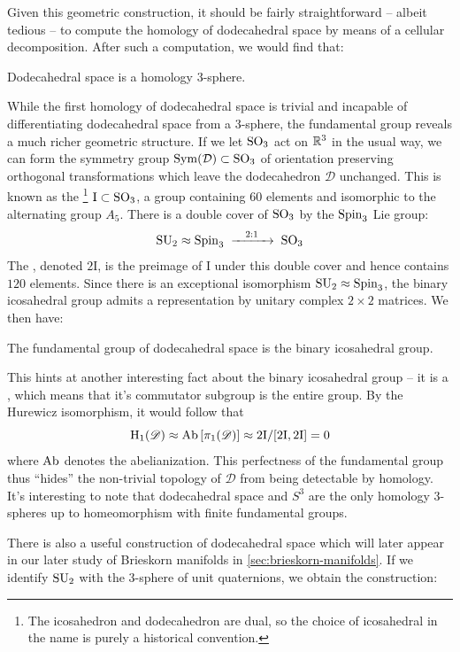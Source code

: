 Given this geometric construction, it should be fairly straightforward -- albeit tedious -- to compute the homology of dodecahedral space by means of a cellular decomposition. After such a computation, we would find that:
\begin{proposition}
	Dodecahedral space is a homology $3$-sphere.
\end{proposition}

While the first homology of dodecahedral space is trivial and incapable of differentiating dodecahedral space from a 3-sphere, the fundamental group reveals a much richer geometric structure. If we let ${\operatorname{SO}}_3$ act on $\mathbb{R}^3$ in the usual way, we can form the symmetry group $\operatorname{\operatorname{Sym}}(\mathcal{D})\subset {\operatorname{SO}}_3$ of orientation preserving orthogonal transformations which leave the dodecahedron $\mathcal{D}$ unchanged. This is known as the \footnote{The icosahedron and dodecahedron are dual, so the choice of icosahedral in the name is purely a historical convention.} $\mathrm{I}\subset {\operatorname{SO}}_3$, a group containing $60$ elements and isomorphic to the alternating group $A_5$. There is a double cover of ${\operatorname{SO}}_3$ by the ${\operatorname{Spin}}_3$ Lie group:
\[
	\SU_2\cong \Spin_3\lkxto[2:1] \SO_3
\]
The , denoted $2\mathrm{I}$, is the preimage of $\mathrm{I}$ under this double cover and hence contains $120$ elements. Since there is an exceptional isomorphism ${\operatorname{SU}}_2\approx {\operatorname{Spin}}_3$, the binary icosahedral group admits a representation by unitary complex $2\times 2$ matrices.
We then have:
\begin{proposition}
	The fundamental group of dodecahedral space is the binary icosahedral group.
\end{proposition}
This hints at another interesting fact about the binary icosahedral group -- it is a , which means that it's commutator subgroup is the entire group. By the Hurewicz isomorphism, it would follow that
\[
	\operatorname{H}_1(\mathscr{D}) \approx \operatorname{\operatorname{Ab}}\left[ \pi_1(\mathscr{D})\right] \approx 2\mathrm{I}/[2\mathrm{I}, 2\mathrm{I}] = 0
\]
where $\operatorname{\operatorname{Ab}}$ denotes the abelianization. This perfectness of the fundamental group thus ``hides'' the non-trivial topology of $\mathscr{D}$ from being detectable by homology. It's interesting to note that dodecahedral space and $S^3$ are the only homology $3$-spheres up to homeomorphism with finite fundamental groups.

There is also a useful construction of dodecahedral space which will later appear in our later study of Brieskorn manifolds in \cref{sec:brieskorn-manifolds}. If we identify ${\operatorname{SU}}_2$ with the $3$-sphere of unit quaternions, we obtain the construction:

